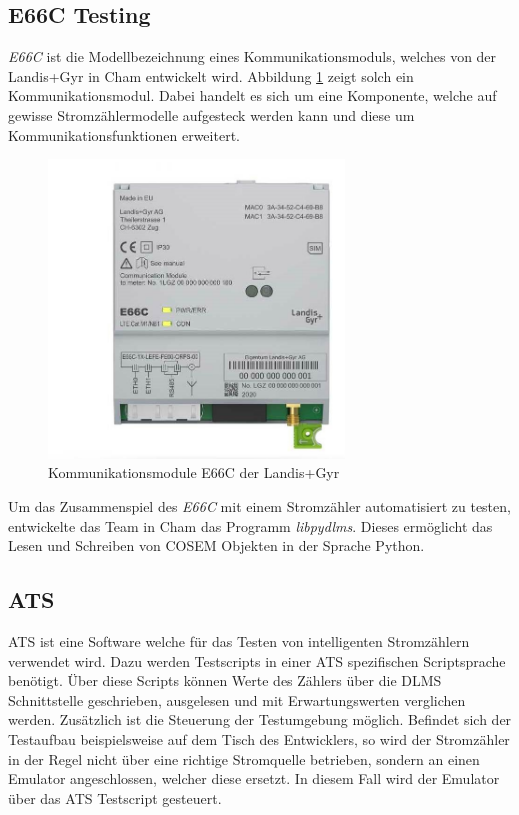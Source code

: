 \subsection{E66C Testing}\label{pythonTesting}
\textit{E66C} ist die Modellbezeichnung eines Kommunikationsmoduls, welches von der Landis+Gyr in Cham entwickelt wird.
Abbildung \ref{fig:e66c} zeigt solch ein Kommunikationsmodul.
Dabei handelt es sich um eine Komponente, welche auf gewisse Stromzählermodelle aufgesteck werden kann und diese um Kommunikationsfunktionen erweitert.

\begin{figure}[H]
   \centering
   \includegraphics[width=0.7\textwidth]{gfx/landis-e66c.jpg}
   \caption{
      Kommunikationsmodule E66C der Landis+Gyr
   }
   \label{fig:e66c}
\end{figure}

Um das Zusammenspiel des \textit{E66C} mit einem Stromzähler automatisiert zu testen, entwickelte das Team in Cham das Programm \textit{libpydlms}.
Dieses ermöglicht das Lesen und Schreiben von \ac{COSEM} Objekten in der Sprache Python.


\subsection{ATS}\label{ats}
\ac{ATS} ist eine Software welche für das Testen von intelligenten Stromzählern verwendet wird.
Dazu werden Testscripts in einer \ac{ATS} spezifischen Scriptsprache benötigt.
Über diese Scripts können Werte des Zählers über die \ac{DLMS} Schnittstelle geschrieben, ausgelesen und mit Erwartungswerten verglichen werden.
Zusätzlich ist die Steuerung der Testumgebung möglich.
Befindet sich der Testaufbau beispielsweise auf dem Tisch des Entwicklers, so wird der Stromzähler in der Regel nicht über eine richtige Stromquelle betrieben, sondern an einen Emulator angeschlossen, welcher diese ersetzt.
In diesem Fall wird der Emulator über das \ac{ATS} Testscript gesteuert.

